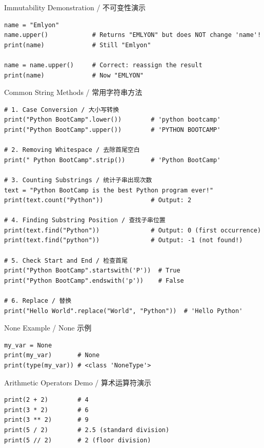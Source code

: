 \documentclass[11pt,a4paper]{report}
\begin{document}
\begin{examplebox}{Immutability Demonstration / 不可变性演示}
\begin{lstlisting}
name = "Emlyon"
name.upper()            # Returns "EMLYON" but does NOT change 'name'!
print(name)             # Still "Emlyon"

name = name.upper()     # Correct: reassign the result
print(name)             # Now "EMLYON"
\end{lstlisting}
\end{examplebox}

\begin{examplebox}{Common String Methods / 常用字符串方法}
\begin{lstlisting}
# 1. Case Conversion / 大小写转换
print("Python BootCamp".lower())        # 'python bootcamp'
print("Python BootCamp".upper())        # 'PYTHON BOOTCAMP'

# 2. Removing Whitespace / 去除首尾空白
print(" Python BootCamp".strip())       # 'Python BootCamp'

# 3. Counting Substrings / 统计子串出现次数
text = "Python BootCamp is the best Python program ever!"
print(text.count("Python"))             # Output: 2

# 4. Finding Substring Position / 查找子串位置
print(text.find("Python"))              # Output: 0 (first occurrence)
print(text.find("python"))              # Output: -1 (not found!)

# 5. Check Start and End / 检查首尾
print("Python BootCamp".startswith('P'))  # True
print("Python BootCamp".endswith('p'))    # False

# 6. Replace / 替换
print("Hello World".replace("World", "Python"))  # 'Hello Python'
\end{lstlisting}
\end{examplebox}

\begin{examplebox}{None Example / None 示例}
\begin{lstlisting}
my_var = None
print(my_var)       # None
print(type(my_var)) # <class 'NoneType'>
\end{lstlisting}
\end{examplebox}

\begin{examplebox}{Arithmetic Operators Demo / 算术运算符演示}
\begin{lstlisting}
print(2 + 2)        # 4
print(3 * 2)        # 6
print(3 ** 2)       # 9
print(5 / 2)        # 2.5 (standard division)
print(5 // 2)       # 2 (floor division)
\end{lstlisting}
\end{examplebox}
\end{document}
